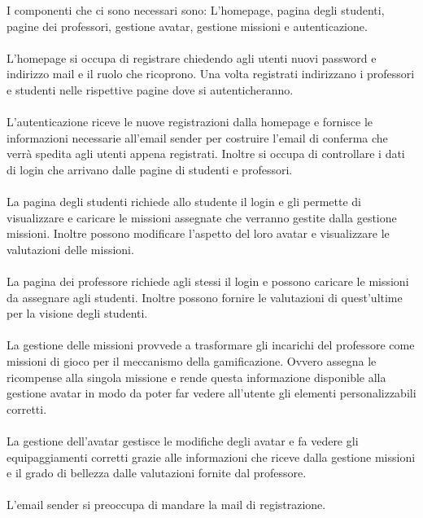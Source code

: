 I componenti che ci sono necessari sono: L'homepage, pagina degli studenti, pagine dei professori, gestione avatar, gestione missioni e autenticazione.\\
\\
L'homepage si occupa di registrare chiedendo agli utenti nuovi password e indirizzo mail e il ruolo che ricoprono. Una volta registrati indirizzano i professori e studenti nelle rispettive pagine dove si autenticheranno.\\
\\
L'autenticazione riceve le nuove registrazioni dalla homepage e fornisce le informazioni necessarie all'email sender per costruire l'email di conferma che verrà spedita agli utenti appena registrati. Inoltre si occupa di controllare i dati di login che arrivano dalle pagine di studenti e professori.\\
\\
La pagina degli studenti richiede allo studente il login e gli permette di visualizzare e caricare le missioni assegnate che verranno gestite dalla gestione missioni. Inoltre possono modificare l'aspetto del loro avatar e visualizzare le valutazioni delle missioni.\\
\\
La pagina dei professore richiede agli stessi il login e possono caricare le missioni da assegnare agli studenti. Inoltre possono fornire le valutazioni di quest'ultime per la visione degli studenti.\\
\\
La gestione delle missioni provvede a trasformare gli incarichi del professore come missioni di gioco per il meccanismo della gamificazione. Ovvero assegna le ricompense alla singola missione e rende questa informazione disponible alla gestione avatar in modo da poter far vedere all'utente gli elementi personalizzabili corretti.\\
\\
La gestione dell'avatar gestisce le modifiche degli avatar e fa vedere gli equipaggiamenti corretti grazie alle informazioni che riceve dalla gestione missioni e il grado di bellezza dalle valutazioni fornite dal professore.\\
\\
L'email sender si preoccupa di mandare la mail di registrazione.


